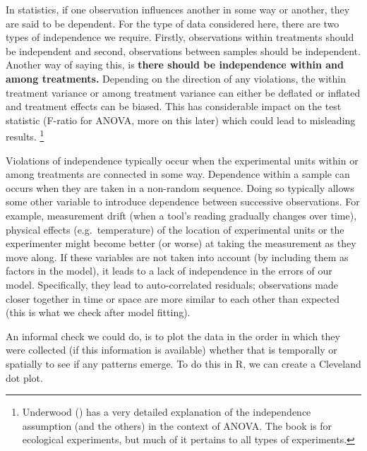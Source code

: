 \documentclass[
  letterpaper,
]{book}
\newenvironment{Shaded}{\begin{snugshade}}{\end{snugshade}}
\newcommand{\AttributeTok}[1]{\textcolor[rgb]{0.13,0.29,0.53}{#1}}
\newcommand{\FunctionTok}[1]{\textcolor[rgb]{0.13,0.29,0.53}{\textbf{#1}}}
\newcommand{\NormalTok}[1]{#1}
\newcommand{\SpecialCharTok}[1]{\textcolor[rgb]{0.81,0.36,0.00}{\textbf{#1}}}
\newcommand{\StringTok}[1]{\textcolor[rgb]{0.31,0.60,0.02}{#1}}
\begin{document}
In statistics, if one observation influences another in some way or
another, they are said to be dependent. For the type of data considered
here, there are two types of independence we require. Firstly,
observations within treatments should be independent and second,
observations between samples should be independent. Another way of
saying this, is \textbf{there should be independence within and among
treatments.} Depending on the direction of any violations, the within
treatment variance or among treatment variance can either be deflated or
inflated and treatment effects can be biased. This has considerable
impact on the test statistic (F-ratio for ANOVA, more on this later)
which could lead to misleading results. \footnote{Underwood
  () has a very detailed explanation
  of the independence assumption (and the others) in the context of
  ANOVA. The book is for ecological experiments, but much of it pertains
  to all types of experiments.}

Violations of independence typically occur when the experimental units
within or among treatments are connected in some way. Dependence within
a sample can occurs when they are taken in a non-random sequence. Doing
so typically allows some other variable to introduce dependence between
successive observations. For example, measurement drift (when a tool's
reading gradually changes over time), physical effects
(e.g.~temperature) of the location of experimental units or the
experimenter might become better (or worse) at taking the measurement as
they move along. If these variables are not taken into account (by
including them as factors in the model), it leads to a lack of
independence in the errors of our model. Specifically, they lead to
auto-correlated residuals; observations made closer together in time or
space are more similar to each other than expected (this is what we
check after model fitting).

An informal check we could do, is to plot the data in the order in which
they were collected (if this information is available) whether that is
temporally or spatially to see if any patterns emerge. To do this in R,
we can create a Cleveland dot plot.

\begin{Shaded}
\end{Shaded}
\end{document}
